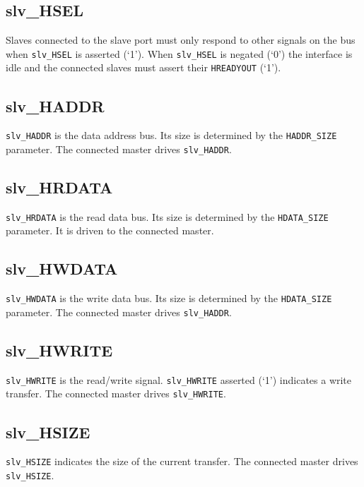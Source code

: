 \subsection{slv\_HSEL}\label{slv_hsel}

Slaves connected to the slave port must only respond to other signals on the bus when
\texttt{slv\_HSEL} is asserted (`1'). When \texttt{slv\_HSEL} is negated (`0') the
interface is idle and the connected slaves must assert their \texttt{HREADYOUT} (`1').

\subsection{slv\_HADDR}\label{slv_haddr}

\texttt{slv\_HADDR} is the data address bus. Its size is determined by the
\texttt{HADDR\_SIZE} parameter. The connected master drives \texttt{slv\_HADDR}.

\subsection{slv\_HRDATA}\label{slv_hrdata}

\texttt{slv\_HRDATA} is the read data bus. Its size is determined by the
\texttt{HDATA\_SIZE} parameter. It is driven to the connected master.

\subsection{slv\_HWDATA}\label{slv_hwdata}

\texttt{slv\_HWDATA} is the write data bus. Its size is determined by the
\texttt{HDATA\_SIZE} parameter. The connected master drives \texttt{slv\_HADDR}.

\subsection{slv\_HWRITE}\label{slv_hwrite}

\texttt{slv\_HWRITE} is the read/write signal. \texttt{slv\_HWRITE} asserted (`1') indicates a
write transfer. The connected master drives \texttt{slv\_HWRITE}.

\subsection{slv\_HSIZE}\label{slv_hsize}

\texttt{slv\_HSIZE} indicates the size of the current transfer. The connected
master drives \texttt{slv\_HSIZE}.


